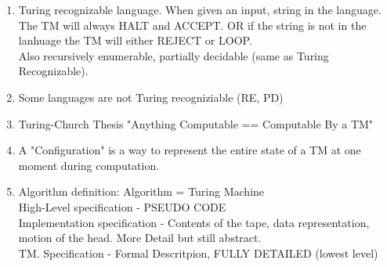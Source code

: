 \documentclass{article}
\begin{document}
\begin{enumerate}[1., leftmargin = 0.5cm]
    \item Turing recognizable language. When given an input, string in the language. The TM will always HALT and ACCEPT.
    OR if the string is not in the lanhuage the TM will either REJECT or LOOP. \\   
        Also recursively enumerable, partially decidable (same as Turing Recognizable).
    
    \item Some languages are not Turing recogniziable (RE, PD)
    
    \item Turing-Church Thesis "Anything Computable == Computable By a TM"

    \item A "Configuration" is a way to represent the entire state of a TM at one moment during computation.

    \item Algorithm definition: Algorithm = Turing Machine \\
        High-Level specification - PSEUDO CODE \\
        Implementation specification - Contents of the tape, data representation, motion of the head. More Detail but still abstract.\\
        TM. Specification - Formal Descritpion, FULLY DETAILED (lowest level)
    
\end{enumerate}
\end{document}
